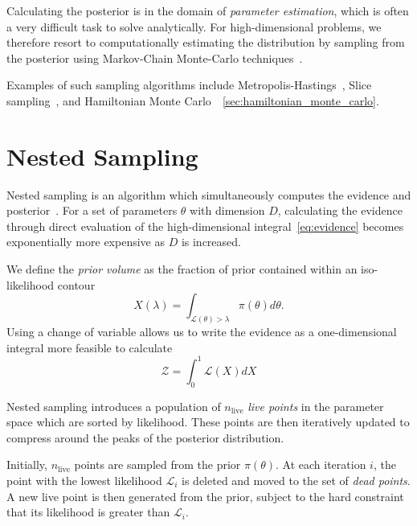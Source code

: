 \documentclass[11pt]{article}
\begin{document}
    Calculating the posterior is in the domain of \emph{parameter estimation}, which is often a very difficult task
    to solve analytically.
    For high-dimensional problems, we therefore resort to computationally estimating the distribution by sampling
    from the posterior using Markov-Chain Monte-Carlo techniques~\cite{gupta2014comparison, delmoral2013mean}.

    Examples of such sampling algorithms include Metropolis-Hastings~\cite{Metropolis_OG},
    Slice sampling~\cite{neal2003slice}, and Hamiltonian Monte Carlo~\cite{HMC_Duane, neal1996monte}~\ref{sec:hamiltonian_monte_carlo}.

    \section{Nested Sampling}\label{sec:nested_sampling}
    Nested sampling is an algorithm which simultaneously computes
    the evidence and posterior~\cite{Skilling2006, Handley_polychord, NS_Review_2022}.
    For a set of parameters $\theta$ with dimension $D$, calculating the evidence through direct evaluation of the
    high-dimensional integral~\eqref{eq:evidence} becomes exponentially more expensive as $D$ is increased.

    We define the \emph{prior volume} as the fraction of prior contained within an iso-likelihood contour
    \begin{equation}\label{eq:prior_volume}
        X(\lambda) = \int_{\mathcal{L}(\theta)>\lambda} \pi(\theta) d\theta.
    \end{equation}
    Using a change of variable allows us to write the evidence as a one-dimensional integral more feasible to calculate
    \begin{equation}\label{eq:evidence_ns}
        \mathcal{Z} = \int_0^1 {\mathcal{L}(X)} dX
    \end{equation}

    Nested sampling introduces a population of $n_{\text{live}}$ \emph{live points} in the parameter space which are sorted
    by likelihood.
    These points are then iteratively updated to compress around the peaks of the posterior distribution.

    Initially, $n_{\text{live}}$ points are sampled from the prior $\pi(\theta)$.
    At each iteration $i$, the point with the lowest likelihood $\mathcal{L}_i$ is deleted and moved to the set
    of \emph{dead points}.
    A new live point is then generated from the prior, subject to the hard constraint that its likelihood is
    greater than $\mathcal{L}_i$.
\end{document}
